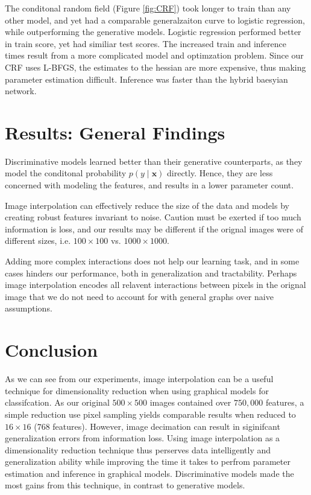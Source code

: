 \documentclass{article}
\begin{document}
The conditonal random field (Figure \ref{fig:CRF}) took longer to train than
any other model, and yet
had a comparable generalzaiton curve to logistic regression, while outperforming
the generative models. Logistic regression performed better in train score, yet
had similiar test scores. The increased train and inference times result from
a more complicated model and optimzation problem. Since our CRF uses L-BFGS,
the estimates to the hessian are more expensive, thus making parameter estimation
difficult. Inference was faster than the hybrid baesyian network.

\section{Results: General Findings}
Discriminative models learned better than their generative counterparts, as they
model the conditonal probability $p(y\mid \mathbf{x})$ directly. Hence, they are
less concerned with modeling the features, and results in a lower parameter count.

Image interpolation can effectively reduce the size of the data and models
by creating robust features invariant to noise. Caution must be exerted if too
much information is loss, and our results may be different if the orignal images
were of different sizes, i.e. $100 \times 100$ vs. $1000 \times 1000$.

Adding more complex interactions does not help our learning task, and in some cases
hinders our performance, both in generalization and tractability. Perhaps image
interpolation encodes all relavent interactions between pixels in the orignal
image that we do not need to account for with general graphs over naive assumptions.



\section{Conclusion}
\label{sec:conclusion}
As we can see from our experiments, image interpolation can be a useful technique
for dimensionality reduction when using graphical models for classifcation.
As our original $500 \times 500$ images contained over $750,000$ features, a simple
reduction use pixel sampling yields comparable results when reduced to
$16 \times 16$ ($768$ features). However, image decimation can result in siginifcant
generalization errors from information loss. Using image interpolation as
a dimensionality reduction technique thus perserves data intelligently and
generalization ability while improving the time it takes to perfrom
parameter estimation and inference in graphical models. Discriminative models
made the most gains from this technique, in contrast to generative models.
\end{document}
